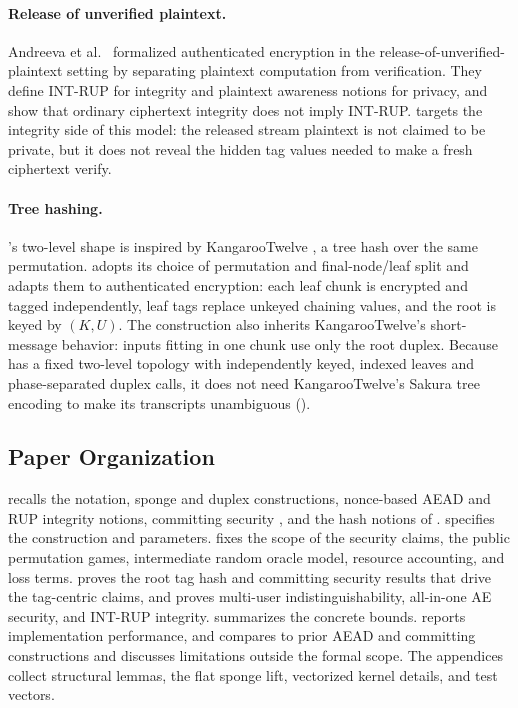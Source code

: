 \paragraph{Release of unverified plaintext.}
Andreeva et al.~\cite{ABLMMY14} formalized authenticated encryption in the
release-of-unverified-plaintext setting by separating plaintext computation
from verification. They define \textsf{INT-RUP} for integrity and plaintext
awareness notions for privacy, and show that ordinary ciphertext integrity does
not imply \textsf{INT-RUP}. \TW{} targets the integrity side of this model: the
released stream plaintext is not claimed to be private, but it does not reveal
the hidden tag values needed to make a fresh ciphertext verify.

\paragraph{Tree hashing.}
\TW{}'s two-level shape is inspired by KangarooTwelve \cite{BDPVVV16}, a tree
hash over the same permutation. \TW{} adopts its choice of permutation and
final-node/leaf split and adapts them to authenticated encryption: each leaf
chunk is encrypted and tagged independently, leaf tags replace unkeyed chaining
values, and the root is keyed by $(K, U)$. The construction also inherits
KangarooTwelve's short-message behavior: inputs fitting in one chunk use only
the root duplex. Because \TW{} has a fixed two-level topology with independently
keyed, indexed leaves and phase-separated duplex calls, it does not need
KangarooTwelve's Sakura tree encoding \cite{BDPV14} to make its transcripts
unambiguous ().

\subsection{Paper Organization}
\label{sec:organization}

 recalls the notation, sponge and duplex constructions,
nonce-based AEAD and RUP integrity notions, committing security \cite{BH22},
and the hash notions of \cite{RS04}.
 specifies the \TW{} construction and parameters.
 fixes the scope of the security claims, the public
permutation games, intermediate random oracle model, resource accounting, and
loss terms.
 proves the root tag hash and committing
security results that drive the tag-centric claims, and
 proves multi-user indistinguishability, all-in-one
AE security, and \textsf{INT-RUP} integrity.
 summarizes the concrete bounds.
 reports implementation performance, and
 compares \TW{} to prior AEAD and committing constructions
and discusses limitations outside the formal scope. The appendices collect
structural lemmas, the flat sponge lift, vectorized kernel details, and test
vectors.
